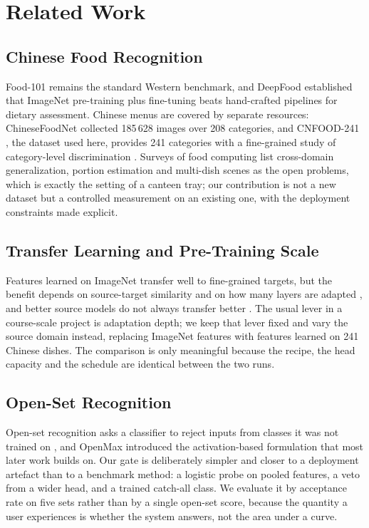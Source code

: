 \section{Related Work}
\subsection{Chinese Food Recognition}
Food-101 \cite{bossard2014food101} remains the standard Western benchmark, and
DeepFood \cite{liu2016deepfood} established that ImageNet pre-training plus
fine-tuning beats hand-crafted pipelines for dietary assessment. Chinese menus
are covered by separate resources: ChineseFoodNet \cite{chen2017chinesefoodnet}
collected 185\,628 images over 208 categories, and CNFOOD-241 \cite{cnfood241},
the dataset used here, provides 241 categories with a fine-grained study of
category-level discrimination \cite{xiong2026cnfood}. Surveys of food computing
\cite{zhang2023foodsurvey} list cross-domain generalization, portion estimation
and multi-dish scenes as the open problems, which is exactly the setting of a
canteen tray; our contribution is not a new dataset but a controlled measurement
on an existing one, with the deployment constraints made explicit.

\subsection{Transfer Learning and Pre-Training Scale}
Features learned on ImageNet \cite{deng2009imagenet} transfer well to
fine-grained targets, but the benefit depends on source-target similarity and on
how many layers are adapted \cite{yosinski2014transfer}, and better source models
do not always transfer better \cite{kornblith2019better}. The usual lever in a
course-scale project is adaptation depth; we keep that lever fixed and vary the
source domain instead, replacing ImageNet features with features learned on 241
Chinese dishes. The comparison is only meaningful because the recipe, the head
capacity and the schedule are identical between the two runs.

\subsection{Open-Set Recognition}
Open-set recognition asks a classifier to reject inputs from classes it was not
trained on \cite{scheirer2013openset}, and OpenMax \cite{bendale2016openset}
introduced the activation-based formulation that most later work builds on. Our
gate is deliberately simpler and closer to a deployment artefact than to a
benchmark method: a logistic probe on pooled features, a veto from a wider head,
and a trained catch-all class. We evaluate it by acceptance rate on five sets
rather than by a single open-set score, because the quantity a user experiences
is whether the system answers, not the area under a curve.

